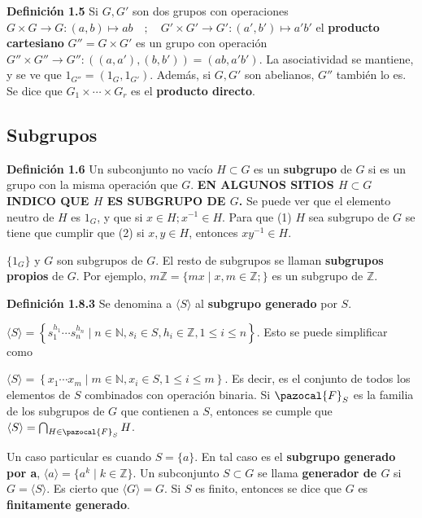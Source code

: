 \documentclass[a4paper, 11pt]{extarticle}
\newcommand{\defi}[1]{\textcolor{azul}{\textbf{Definición #1}}}
\let\mathcal\pazocal
\begin{document}
\defi{1.5} Si \(G,G'\) son dos grupos con operaciones
\(G \times G \rightarrow G: (a,b) \mapsto ab \quad;\quad G' \times G' \rightarrow G': (a', b') \mapsto a'b'\)
 el \textbf{producto cartesiano} \(G'' = G \times G'\) es un grupo con operación 
\(G'' \times G'' \rightarrow G'': ((a, a'), (b, b')) = (ab, a'b')\). La asociatividad se mantiene, 
y se ve que \(1_{G''} = (1_G, 1_{G'})\).
Además, si \(G, G'\) son abelianos, \(G''\) también lo es. Se dice que \(G_1 \times \cdots \times G_r\) es el \textbf{producto directo}.

\subsection*{Subgrupos}
\label{sec:org920c996}
\defi{1.6} Un subconjunto no vacío \(H \subset G\) es un \textbf{subgrupo} de \(G\) si es un grupo con la misma operación que \(G\).
\textbf{EN ALGUNOS SITIOS \(H \subset G\) INDICO QUE \(H\) ES SUBGRUPO DE \(G\).}
Se puede ver que el elemento neutro de \(H\) es \(1_G\), y que si \(x \in H;
x^{-1} \in H\). Para que (1) \(H\) sea subgrupo de \(G\) se tiene que cumplir que
(2) si \(x,y \in H\), entonces \(x y^{-1} \in H\).

\(\{ 1_G \}\) y \(G\) son subgrupos de \(G\). El resto de subgrupos se
llaman \textbf{subgrupos propios} de \(G\). Por ejemplo, \(m \mathbb{Z} = \{ mx \;|\;
x,m \in \mathbb{Z}; 
\}\) es un subgrupo de \(\mathbb{Z}\). 

\defi{1.8.3} Se denomina a \(\langle S \rangle\) al \textbf{subgrupo generado} por \(S\). 


\(\langle S \rangle  = \left\{ s_1^{h_1} \cdots s_n^{h_n} \;|\; n \in \mathbb{N} , s_i \in S, h_i \in \mathbb{Z}
 , 1 \le i \le n
 \right\}\). Esto se puede simplificar como


\(\langle S \rangle  = \left\{ x_1 \cdots x_m \;|\; m \in \mathbb{N} , x_i \in S,  1 \le i \le m
 \right\}\). Es decir, es el conjunto de todos 
 los elementos de \(S\) combinados con operación binaria. Si \(\mathcal{F}_S\) es la
familia de los subgrupos de \(G\) que contienen a \(S\), entonces se cumple
que \(\langle S \rangle = \bigcap_{H \in \mathcal{F}_S}^{} H\).

Un caso particular es cuando \(S = \{ a \}\). En tal caso es el \textbf{subgrupo
generado por a}, \(\langle a \rangle = \{ a^k \;|\; k \in \mathbb{Z}\}\). Un subconjunto \(S \subset G\) se llama \textbf{generador de \(G\)} si \(G = \langle S \rangle\). Es cierto que
\(\langle G \rangle = G\). Si \(S\) es finito, entonces se dice que \(G\) es \textbf{finitamente generado}.
\end{document}
